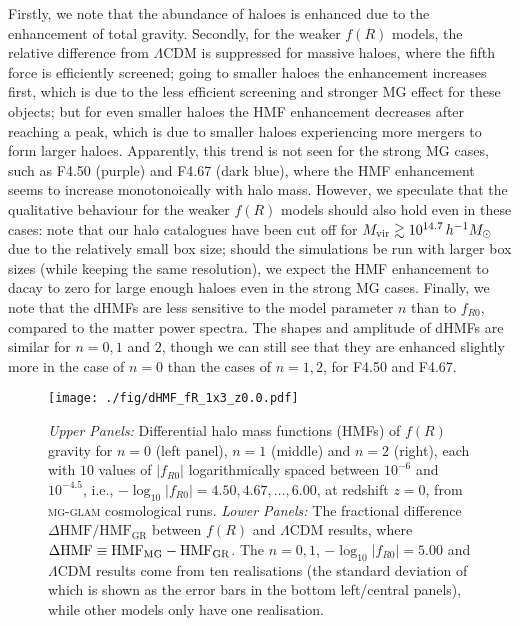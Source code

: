 Firstly, we note that the abundance of haloes is enhanced due to the enhancement of total gravity. Secondly, for the weaker $f(R)$ models, the relative difference from $\Lambda$CDM is suppressed for massive haloes, where the fifth force is efficiently screened; going to smaller haloes the enhancement increases first, which is due to the less efficient screening and stronger \ac{MG} effect for these objects; but for even smaller haloes the HMF enhancement decreases after reaching a peak, which is due to smaller haloes experiencing more mergers to form larger haloes. Apparently, this trend is not seen for the strong \ac{MG} cases, such as F4.50 (purple) and F4.67 (dark blue), where the HMF enhancement seems to increase monotonoically with halo mass. However, we speculate that the qualitative behaviour for the weaker $f(R)$ models should also hold even in these cases: note that our halo catalogues have been cut off for $M_{\rm vir} \gtrsim 10^{14.7} \, h^{-1} M_{\odot}$ due to the relatively small box size; should the simulations be run with larger box sizes (while keeping the same resolution), we expect the HMF enhancement to dacay to zero for large enough haloes even in the strong \ac{MG} cases.
Finally, we note that the dHMFs are less sensitive to the model parameter $n$ than to $f_{R0}$, compared to the matter power spectra. The shapes and amplitude of dHMFs are similar for $n = 0, 1$ and $2$, though we can still see that they are enhanced slightly more in the case of $n=0$ than the cases of $n=1,2$, for F4.50 and F4.67.



\begin{figure}
    \centering 
    \texttt{[image: ./fig/dHMF\_fR\_1x3\_z0.0.pdf]}
    \caption{\textit{Upper Panels:} Differential halo mass functions (HMFs) of $f(R)$ gravity for $n=0$ (left panel), $n=1$ (middle) and $n=2$ (right), each with $10$ values of $|f_{R0}|$ logarithmically spaced between $10^{-6}$ and $10^{-4.5}$, i.e., $-\log_{10}|f_{R0}| = 4.50, 4.67, \dots, 6.00$, at redshift $z=0$, from \textsc{mg-glam} cosmological runs.
    \textit{Lower Panels:} The fractional difference $\Delta \text{HMF} / \text{HMF}_{\mathrm{GR}}$ between $f(R)$ and $\Lambda$CDM results, where $\Delta \text{HMF}  \equiv \text{HMF}_{\rm MG} - \text{HMF}_{\rm GR}$.
    The $n=0,1$, $-\log_{10} |f_{R0}| = 5.00$ and $\Lambda$CDM results come from ten realisations (the standard deviation of which is shown as the error bars in the bottom left/central panels), while other models only have one realisation.}
    \label{fig:hmf_z0_fRn012}
\end{figure}


